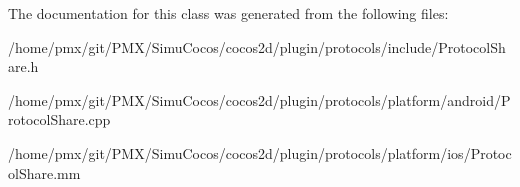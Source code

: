 The documentation for this class was generated from the following files\+:\begin{DoxyCompactItemize}
\item 
/home/pmx/git/\+P\+M\+X/\+Simu\+Cocos/cocos2d/plugin/protocols/include/Protocol\+Share.\+h\item 
/home/pmx/git/\+P\+M\+X/\+Simu\+Cocos/cocos2d/plugin/protocols/platform/android/Protocol\+Share.\+cpp\item 
/home/pmx/git/\+P\+M\+X/\+Simu\+Cocos/cocos2d/plugin/protocols/platform/ios/Protocol\+Share.\+mm\end{DoxyCompactItemize}
